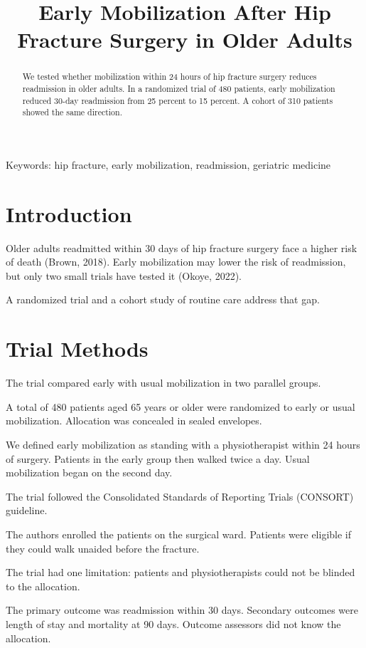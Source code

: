 \documentclass{article}
\title{Early Mobilization After Hip Fracture Surgery in Older Adults}
\date{}
\begin{document}
\maketitle

\begin{abstract}
We tested whether mobilization within 24 hours of hip fracture surgery reduces readmission in older adults. In a randomized trial of 480 patients, early mobilization reduced 30-day readmission from 25 percent to 15 percent. A cohort of 310 patients showed the same direction.
\end{abstract}

\noindent Keywords: hip fracture, early mobilization, readmission, geriatric medicine

\section{Introduction}

Older adults readmitted within 30 days of hip fracture surgery face a higher risk of death (Brown, 2018). Early mobilization may lower the risk of readmission, but only two small trials have tested it (Okoye, 2022).

A randomized trial and a cohort study of routine care address that gap.

\section{Trial Methods}

The trial compared early with usual mobilization in two parallel groups.

A total of 480 patients aged 65 years or older were randomized to early or usual mobilization. Allocation was concealed in sealed envelopes.

We defined early mobilization as standing with a physiotherapist within 24 hours of surgery. Patients in the early group then walked twice a day. Usual mobilization began on the second day.

The trial followed the Consolidated Standards of Reporting Trials (CONSORT) guideline.

The authors enrolled the patients on the surgical ward. Patients were eligible if they could walk unaided before the fracture.

The trial had one limitation: patients and physiotherapists could not be blinded to the allocation.

The primary outcome was readmission within 30 days. Secondary outcomes were length of stay and mortality at 90 days. Outcome assessors did not know the allocation.
\end{document}
